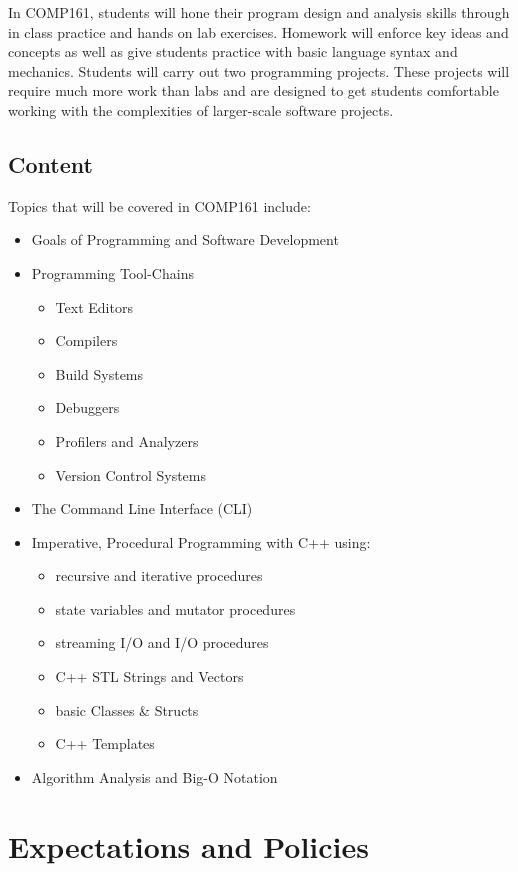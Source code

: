 \documentclass[10pt]{article}
\begin{document}
In COMP161, students will hone their program design and analysis skills through in class practice and hands on lab exercises.  Homework will enforce key ideas and concepts as well as give students practice with basic language syntax and mechanics.  Students will carry out two programming projects.  These projects will require much more work than labs and are designed to get students comfortable working with the complexities of larger-scale software projects.

\subsection{Content}

Topics that will be covered in COMP161 include:
\begin{itemize}
\item Goals of Programming and Software Development
\item Programming Tool-Chains
\begin{itemize}
\item Text Editors
\item Compilers
\item Build Systems
\item Debuggers
\item Profilers and Analyzers
\item Version Control Systems
\end{itemize}
\item The Command Line Interface (CLI) 
\item Imperative, Procedural Programming with C++ using:
\begin{itemize}
\item recursive and iterative procedures
\item state variables and mutator procedures
\item streaming I/O and I/O procedures
\item C++ STL Strings and Vectors
\item basic Classes \& Structs
\item C++ Templates
\end{itemize}
\item Algorithm Analysis and Big-O Notation
\end{itemize}  

\section{Expectations and Policies}
\end{document}
